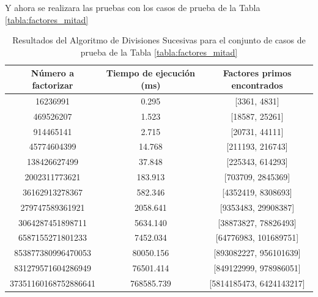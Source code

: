    Y ahora se realizara las pruebas con los casos de prueba de la Tabla \ref{tabla:factores_mitad}

    \begin{table}[H]
        \centering
        \begin{tabular}{ccc}
        \toprule
        Número a factorizar & Tiempo de ejecución (ms) & Factores primos encontrados\\
        \midrule
        16236991 & 0.295 & [3361, 4831]\\
        469526207 & 1.523 & [18587, 25261]\\
        914465141 & 2.715 & [20731, 44111]\\
        45774604399 & 14.768 & [211193, 216743]\\
        138426627499 & 37.848 & [225343, 614293]\\
        2002311773621 & 183.913 & [703709, 2845369]\\
        36162913278367 & 582.346 & [4352419, 8308693]\\
        279747589361921 & 2058.641 & [9353483, 29908387]\\
        3064287451898711 & 5634.140 & [38873827, 78826493]\\
        6587155271801233 & 7452.034 & [64776983, 101689751]\\
        853877380996470053 & 80050.156 & [893082227, 956101639]\\
        831279571604286949 & 76501.414 & [849122999, 978986051]\\
        37351160168752886641 & 768585.739 & [5814185473, 6424143217]\\

        \bottomrule
        \end{tabular}
        \caption{Resultados del Algoritmo de Divisiones Sucesivas para el conjunto de casos de prueba de la Tabla \ref{tabla:factores_mitad}}
        \label{tab:res-trial_2}
    \end{table}

